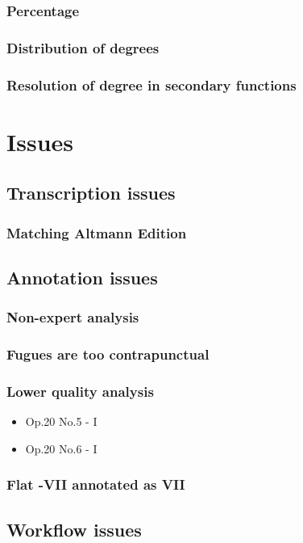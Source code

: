 		\subsubsection{Percentage}
		\subsubsection{Distribution of degrees}
		\subsubsection{Resolution of degree in secondary functions}
\section{Issues}
	\subsection{Transcription issues}
		\subsubsection{Matching Altmann Edition}
	\subsection{Annotation issues}
		\subsubsection{Non-expert analysis}
		\subsubsection{Fugues are too contrapunctual}
		\subsubsection{Lower quality analysis}
    \begin{itemize}
    \item Op.20 No.5 - I
		\item Op.20 No.6 - I
    \end{itemize}
		\subsubsection{Flat -VII annotated as VII}
	\subsection{Workflow issues}
